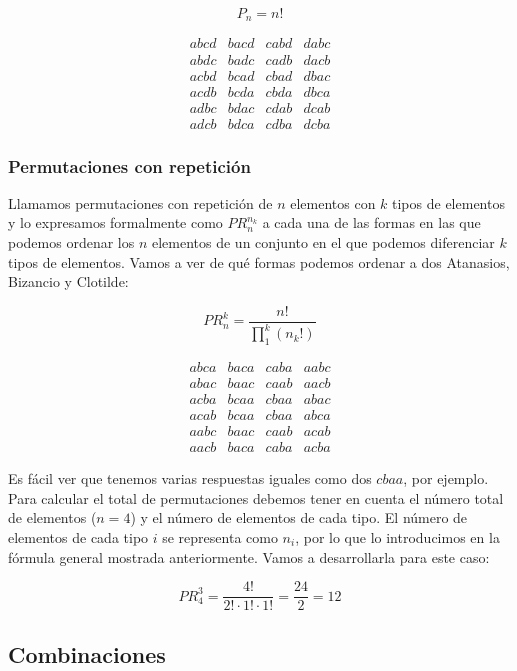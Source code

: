 \[P_n = n!\]

\[
\begin{array}{cccc}
	abcd & bacd & cabd & dabc \\
	abdc & badc & cadb & dacb \\
	acbd & bcad & cbad & dbac \\
	acdb & bcda & cbda & dbca \\
	adbc & bdac & cdab & dcab \\
	adcb & bdca & cdba & dcba
\end{array}
\]

\subsubsection{Permutaciones con repetición}

Llamamos permutaciones con repetición de $n$ elementos con $k$ tipos de elementos y lo expresamos formalmente como $PR_{n}^{n_k}$ a cada una de las formas en las que podemos ordenar los $n$ elementos de un conjunto en el que podemos diferenciar $k$ tipos de elementos.
Vamos a ver de qué formas podemos ordenar a dos Atanasios, Bizancio y Clotilde:

\[PR_{n}^{k} = \frac{n!}{\prod_{1}^{k}(n_k!)}\]

\[
\begin{array}{cccc}
	abca & baca & caba & aabc \\
	abac & baac & caab & aacb \\
	acba & bcaa & cbaa & abac \\
	acab & bcaa & cbaa & abca \\
	aabc & baac & caab & acab \\
	aacb & baca & caba & acba
\end{array}
\]

Es fácil ver que tenemos varias respuestas iguales como dos $cbaa$, por ejemplo.
Para calcular el total de permutaciones debemos tener en cuenta el número total de elementos ($n = 4$) y el número de elementos de cada tipo.
El número de elementos de cada tipo $i$ se representa como $n_i$, por lo que lo introducimos en la fórmula general mostrada anteriormente.
Vamos a desarrollarla para este caso:

\[PR_{4}^{3} = \frac{4!}{2! \cdot 1! \cdot 1!} = \frac{24}{2} = 12\]

\subsection{Combinaciones}\label{combinaciones}

